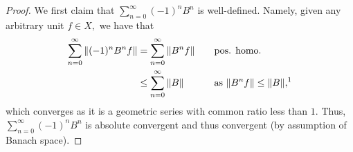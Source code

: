 \documentclass[10pt]{article}
\begin{document}
\begin{proof}



    We first claim that $\sum_{n=0}^{\infty} (-1)^n B^n$ is well-defined.  Namely, given any arbitrary unit $f\in X,$ we have that
    \begin{alignat*}{2}
        \sum_{n=0}^{\infty} \Vert (-1)^nB^n f\Vert &= \sum_{n=0}^{\infty}\Vert B^n f\Vert \quad&&\text{pos. homo.}\\
        &\le \sum_{n=0}^{\infty} \Vert B \Vert \quad&&\text{as $\Vert B^nf\Vert \le \Vert B\Vert,$\footnotemark}
    \end{alignat*}
    which converges as it is a geometric series with common ratio less than $1.$ Thus, $\sum_{n=0}^{\infty} (-1)^n B^n$ is absolute convergent and thus convergent (by assumption of Banach space).


\end{proof}
\end{document}
